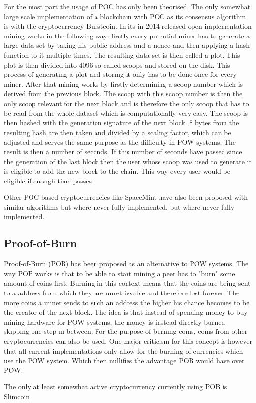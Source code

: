 For the most part the usage of POC has only been theorised. The only somewhat large scale implementation of a blockchain with POC as its consensus algorithm is with the cryptocurrency Burstcoin.
In its in 2014 released open implementation mining works in the following way: firstly every potential miner has to generate a large data set by taking his public address and a nonce and then
applying a hash function to it multiple times. The resulting data set is then called a plot. This plot is then divided into 4096 so called scoops and stored on the disk. This process of generating
a plot and storing it only has to be done once for every miner. After that mining works by firstly determining a scoop number which is derived from the previous block. The scoop with this scoop
number is then the only scoop relevant for the next block and is therefore the only scoop that has to be read from the whole dataset which is computationally very easy. The scoop is then hashed
with the generation signature of the next block. 8 bytes from the resulting hash are then taken and divided by a scaling factor, which can be adjusted and serves the same purpose as the difficulty
in POW systems. The result is then a number of seconds. If this number of seconds have passed since the generation of the last block then the user whose scoop was used to generate it is eligible
to add the new block to the chain. This way every user would be eligible if enough time passes.\cite{url:burstcoin}\par
Other POC based cryptocurrencies like SpaceMint have also been proposed with similar algorithms but where never fully implemented. but where never fully implemented.\cite{url:spacemint}

\subsection{Proof-of-Burn}

Proof-of-Burn (POB) has been proposed as an alternative to POW systems. The way POB works is that to be able to start mining a peer has to "burn" some amount of coins first. Burning in this context
means that the coins are being sent to a address from which they are unretrievable and therefore lost forever. The more coins a miner sends to such an address the higher his chance becomes
to be the creator of the next block. The idea is that instead of spending money to buy mining hardware for POW systems, the money is instead directly burned skipping one step in between.
For the purpose of burning coins, coins from other cryptocurrencies can also be used. One major criticism for this concept is however that all current implementations only allow for the
burning of currencies which use the POW system. Which then nullifies the advantage POB would have over POW.\par
The only at least somewhat active cryptocurrency currently using POB is Slimcoin\cite{url:pob}

